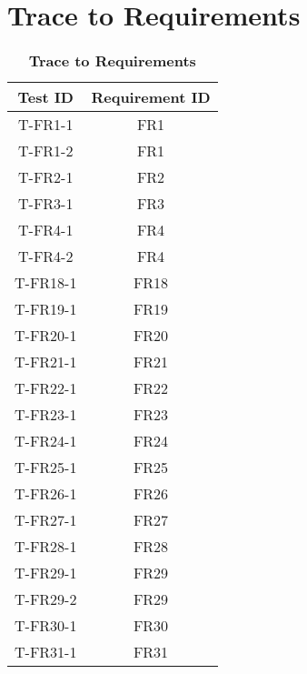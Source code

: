 \documentclass[12pt, titlepage]{article}
\begin{document}
\section{Trace to Requirements}
    \begin{center}
        \begin{longtable}{ |c|c| } 
            \caption{\textbf{Trace to Requirements}} \label{tab:long}\\
            \hline
            \multicolumn{1}{|c|}{\textbf{Test ID}} & \multicolumn{1}{c|}{\textbf{Requirement ID}} \\ 
            \hline 
            \endfirsthead
            
            \hline
            T-FR1-1     & FR1 \\ 
            T-FR1-2     & FR1 \\ 
            \hline
            T-FR2-1     & FR2 \\ 
            \hline
            T-FR3-1     & FR3 \\ 
            \hline
            T-FR4-1     & FR4 \\ 
            T-FR4-2     & FR4 \\ 
            \hline
            T-FR18-1    & FR18 \\ 
            \hline
            T-FR19-1    & FR19 \\ 
            \hline
            T-FR20-1    & FR20 \\ 
            \hline
            T-FR21-1    & FR21 \\ 
            \hline
            T-FR22-1    & FR22 \\ 
            \hline
            T-FR23-1    & FR23 \\ 
            \hline
            T-FR24-1    & FR24 \\ 
            \hline
            T-FR25-1    & FR25 \\ 
            \hline
            T-FR26-1    & FR26 \\ 
            \hline
            T-FR27-1    & FR27 \\ 
            \hline
            T-FR28-1    & FR28 \\
            \hline
            T-FR29-1    & FR29 \\ 
            T-FR29-2    & FR29 \\ 
            \hline
            T-FR30-1    & FR30 \\ 
            \hline
            T-FR31-1    & FR31 \\ 

\end{longtable}
\end{center}
\end{document}
